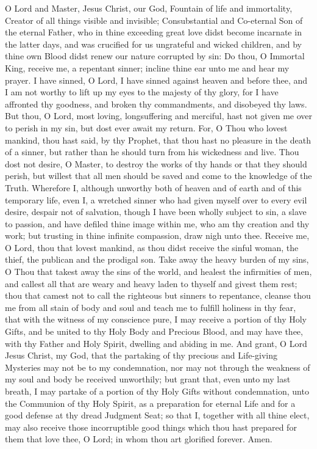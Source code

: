     O Lord and Master, Jesus Christ, our God, Fountain of life and immortality, Creator of all things visible and invisible; Consubstantial and Co-eternal Son of the eternal Father, who in thine exceeding great love didst become incarnate in the latter days, and was crucified for us ungrateful and wicked children, and by thine own Blood didst renew our nature corrupted by sin: Do thou, O Immortal King, receive me, a repentant sinner; incline thine ear unto me and hear my prayer. I have sinned, O Lord, I have sinned against heaven and before thee, and I am not worthy to lift up my eyes to the majesty of thy glory, for I have affronted thy goodness, and broken thy commandments, and disobeyed thy laws. But thou, O Lord, most loving, longsuffering and merciful, hast not given me over to perish in my sin, but dost ever await my return. For, O Thou who lovest mankind, thou hast said, by thy Prophet, that thou hast no pleasure in the death of a sinner, but rather than he should turn from his wickedness and live. Thou dost not desire, O Master, to destroy the works of thy hands or that they should perish, but willest that all men should be saved and come to the knowledge of the Truth. Wherefore I, although unworthy both of heaven and of earth and of this temporary life, even I, a wretched sinner who had given myself over to every evil desire, despair not of salvation, though I have been wholly subject to sin, a slave to passion, and have defiled thine image within me, who am thy creation and thy work; but trusting in thine infinite compassion, draw nigh unto thee. Receive me, O Lord, thou that lovest mankind, as thou didst receive the sinful woman, the thief, the publican and the prodigal son. Take away the heavy burden of my sins, O Thou that takest away the sins of the world, and healest the infirmities of men, and callest all that are weary and heavy laden to thyself and givest them rest; thou that camest not to call the righteous but sinners to repentance, cleanse thou me from all stain of body and soul and teach me to fulfill holiness in thy fear, that with the witness of my conscience pure, I may receive a portion of thy Holy Gifts, and be united to thy Holy Body and Precious Blood, and may have thee, with thy Father and Holy Spirit, dwelling and abiding in me. And grant, O Lord Jesus Christ, my God, that the partaking of thy precious and Life-giving Mysteries may not be to my condemnation, nor may not through the weakness of my soul and body be received unworthily; but grant that, even unto my last breath, I may partake of a portion of thy Holy Gifts without condemnation, unto the Communion of thy Holy Spirit, as a preparation for eternal Life and for a good defense at thy dread Judgment Seat; so that I, together with all thine elect, may also receive those incorruptible good things which thou hast prepared for them that love thee, O Lord; in whom thou art glorified forever. Amen.

